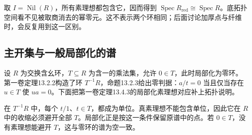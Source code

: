 \ProseParagraphBreak
取 \(I=\operatorname{Nil}(R)\)，所有素理想都包含它，因而得到 \(\operatorname{Spec}R_{\mathrm{red}}\cong\operatorname{Spec}R\)。底拓扑空间看不见被取商消去的幂零元。这不表示两个环相同；后面讨论加厚点与纤维时，会反复用到这一区别。

\subsection{主开集与一般局部化的谱}
\label{b3:subsec:0104:03}

设 \(R\) 为交换含幺环，\(T\subseteq R\) 为含一的乘法集，允许 \(0\in T\)，此时局部化为零环。第一卷定理13.2.2构造了环 \(T^{-1}R\)，命题13.2.3给出零判据：\(a/t=0\) 当且仅当存在 \(u\in T\) 使 \(ua=0\)。下面把第一卷定理13.4.3的局部化素理想对应补上拓扑说明。

\ProseParagraphBreak
在 \(T^{-1}R\) 中，每个 \(t/1\)、\(t\in T\)，都成为单位。真素理想不能包含单位，因此它在 \(R\) 中的收缩必须避开全部 \(T\)。局部化正是按这一条件保留原谱中的点。若 \(0\in T\)，没有素理想能避开 \(T\)，这与零环的谱为空一致。

